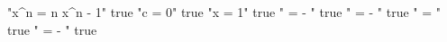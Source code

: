"x^n = n x^{n - 1}" true
"c = 0" true
"x = 1" true
" = - " true
" = - " true
" = " true
" = - " true
